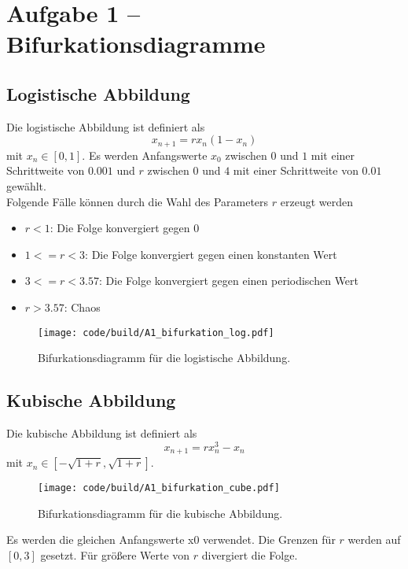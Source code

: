 \section{Aufgabe 1 – Bifurkationsdiagramme}
\label{sec:A1}
\subsection{Logistische Abbildung}
Die logistische Abbildung ist definiert als
\begin{equation}
    x_{n+1} = r x_n (1 - x_n)
\end{equation}
mit $x_n \in [0, 1]$.
Es werden Anfangswerte $x_0$ zwischen $0$ und $1$ mit einer Schrittweite von $0.001$ und $r$ zwischen $0$ und $4$ mit einer Schrittweite von $0.01$ gewählt.
\\
Folgende Fälle können durch die Wahl des Parameters $r$ erzeugt werden
\begin{itemize}
    \item $r < 1$: Die Folge konvergiert gegen $0$
    \item $1 <= r < 3$: Die Folge konvergiert gegen einen konstanten Wert
    \item $3 <= r < 3.57$: Die Folge konvergiert gegen einen periodischen Wert
    \item $r > 3.57$: Chaos
\end{itemize}

\begin{figure}
    \centering
    \texttt{[image: code/build/A1\_bifurkation\_log.pdf]}
    \caption{Bifurkationsdiagramm für die logistische Abbildung.}
    \label{fig:A1_bifurkation}
\end{figure}
\FloatBarrier

\subsection{Kubische Abbildung}
Die kubische Abbildung ist definiert als
\begin{equation}
    x_{n+1} = r x_n^3 - x_n
\end{equation}
mit $x_n \in [-\sqrt{1+r}, \sqrt{1+r}]$.
\begin{figure}
    \centering
    \texttt{[image: code/build/A1\_bifurkation\_cube.pdf]}
    \caption{Bifurkationsdiagramm für die kubische Abbildung.}
    \label{fig:A1_kubisch}
\end{figure}
Es werden die gleichen Anfangswerte x0 verwendet.
Die Grenzen für $r$ werden auf $[0, 3]$ gesetzt.
Für größere Werte von $r$ divergiert die Folge.